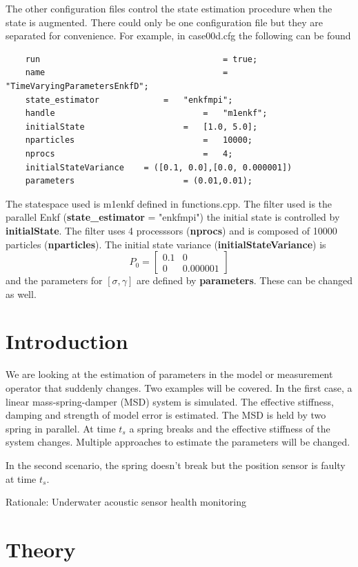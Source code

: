 \documentclass[]{elsarticle}
\begin{document}
The other configuration files control the state estimation procedure when the state is augmented. There could only be one configuration file but they are separated for convenience. For example, in case00d.cfg the following can be found
\begin{verbatim}
	run										= true;
	name 									=	"TimeVaryingParametersEnkfD";
	state_estimator				=	"enkfmpi";
	handle 								=	"m1enkf";
	initialState 					=	[1.0, 5.0];
	nparticles							=	10000;
	nprocs								=	4;
	initialStateVariance 	= ([0.1, 0.0],[0.0, 0.000001])
	parameters 						= (0.01,0.01);
\end{verbatim}
The statespace used is m1enkf defined in functions.cpp. The filter used is the parallel Enkf ({\bf state\_estimator} = "enkfmpi") the initial state is controlled by {\bf initialState}. The filter uses 4 processsors ({\bf nprocs}) and is composed of 10000 particles ({\bf nparticles}). The initial state variance ({\bf initialStateVariance}) is 
\begin{equation}
P_0 = \begin{bmatrix}
0.1 & 0 \\
0 & 0.000001
\end{bmatrix}
\end{equation}
and the parameters for $[\sigma, \gamma]$ are defined by {\bf parameters}. These can be changed as well.


\section*{Introduction}

We are looking at the estimation of parameters in the model or measurement operator that suddenly changes. Two examples will be covered. In the first case, a linear mass-spring-damper (MSD) system is simulated. The effective stiffness, damping and strength of model error is estimated. The MSD is held by two spring in parallel. At time $t_s$ a spring breaks and the effective stiffness of the system changes. Multiple approaches to estimate the parameters will be changed. 

In the second scenario, the spring doesn't break but the position sensor is faulty at time $t_s$. 


Rationale:
Underwater acoustic sensor
health monitoring

\section*{Theory}
\end{document}
